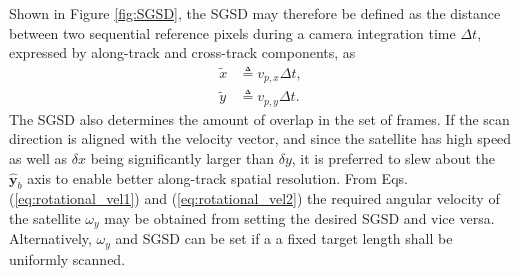 Shown in Figure \ref{fig:SGSD}, the SGSD may therefore be defined as the distance between two sequential reference pixels during a camera integration time $\Delta t$, expressed by  along-track and cross-track components, as
\begin{subequations}
\begin{align}
    \tilde{x} & \triangleq v_{p,x}\Delta t, \label{eq:SGSD1} \\
    \tilde{y} & \triangleq v_{p,y}\Delta t. \label{eq:SGSD2}
\end{align}
\end{subequations}
The SGSD also determines the amount of overlap in the set of frames. If the scan direction is aligned with the velocity vector, and since the satellite has high speed as well as $\delta x$ being significantly larger than $\delta y$, it is preferred to slew about the $\hat{\mathbf{y}}_b$ axis to enable better along-track spatial resolution. From Eqs. (\ref{eq:rotational_vel1}) and (\ref{eq:rotational_vel2}) the required angular velocity of the satellite $\omega_{y}$ may be obtained from setting the desired SGSD and vice versa. Alternatively, $\omega_{y}$ and SGSD can be set if a a fixed target length shall be uniformly scanned. 
